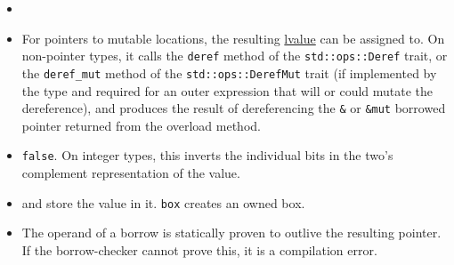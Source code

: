 \documentclass[]{article}
\begin{document}
\begin{itemize}
\item
\item

  For pointers to mutable locations, the resulting
  \hyperref[lvalues-rvalues-and-temporaries]{lvalue} can be assigned to.
  On non-pointer types, it calls the \texttt{deref} method of the
  \texttt{std::ops::Deref} trait, or the \texttt{deref\_mut} method of
  the \texttt{std::ops::DerefMut} trait (if implemented by the type and
  required for an outer expression that will or could mutate the
  dereference), and produces the result of dereferencing the \texttt{\&}
  or \texttt{\&mut} borrowed pointer returned from the overload method.
\item

  \texttt{false}. On integer types, this inverts the individual bits in
  the two's complement representation of the value.
\item

  and store the value in it. \texttt{box} creates an owned box.
\item

  The operand of a borrow is statically proven to outlive the resulting
  pointer. If the borrow-checker cannot prove this, it is a compilation
  error.
\end{itemize}
\end{document}
